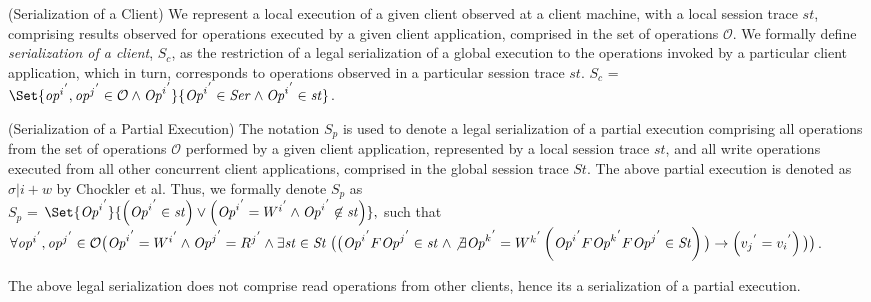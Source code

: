 \documentclass{sig-alternate-05-2015}
\begin{document}
   \begin{definition}(Serialization of a Client)
   We  represent a local execution of a given client observed at a client machine, with a local session trace $\mathit{st} $, comprising results observed for operations executed by a given client application, comprised in the set of operations $\mathcal{O}$.  We formally define \emph{serialization of a client}, $S_c$, as the restriction of a legal serialization of a global execution
    to  the operations invoked by a particular client application, which in turn,
   corresponds to operations observed in a particular session trace $\mathit{st}$.
    $S_c$ = $ \Set{ {\mathit{op}^i}^{'}, {\mathit{op}^j}^{'} \in \mathcal{O} \wedge {\mathit{Op}^i}^{'} } {{\mathit{Op}^i}^{'} \in \mathit{Ser} \wedge {\mathit{Op}^i}^{'} \in \mathit{st} } $.
   \end{definition}\label{def:clientser}
   \begin{definition}(Serialization of a Partial Execution)
   The notation $S_p$ is used to denote a legal serialization of a partial execution comprising all    operations from the set of operations $\mathcal{O}$
   performed by a given client application, represented by a local session trace $\mathit{st}$, and all write
  operations  executed from all other concurrent client applications, comprised in the global session trace $\mathit{St}$. The above partial execution is denoted as $\sigma |i + w$ by Chockler et al. Thus, we formally denote $S_p$ as
   \\ $S_p$ = $\Set{ {\mathit{Op}^i}^{'} } { \left( {\mathit{Op}^i}^{'} \in \mathit{st} \right) \vee \left(
  {\mathit{Op}^i}^{'} = {W^i}^{'} \wedge {\mathit{Op}^i}^{'} \not\in \mathit{st} \right)}, $ such that
  $\forall {\mathit{op}^i}^{'}, {\mathit{op}^j}^{'} \in \mathcal{O} \big( {\mathit{Op}^i}^{'} = {W^i}^{'} \wedge {\mathit{Op}^j}^{'} = {R^j}^{'}  \wedge \\ \exists \mathit{st} \in \mathit{St}  \; \big( \big( {\mathit{Op}^i}^{'} F {\mathit{Op}^j}^{'} \in \mathit{st}  \; \wedge \not\exists {\mathit{Op}^k}^{'} = {W^k}^{'} \\ \left( {\mathit{Op}^i}^{'}  F {\mathit{Op}^k}^{'} F {\mathit{Op}^j}^{'} \in \mathit{St}  \right) \big)
  \rightarrow \left( {v_j}^{'} = {v_i}^{'} \right) \big) \big)$.
  \end{definition}\label{def:parser}
  The above legal serialization does not comprise read operations from other clients, hence its a  serialization of a partial execution.
\end{document}
